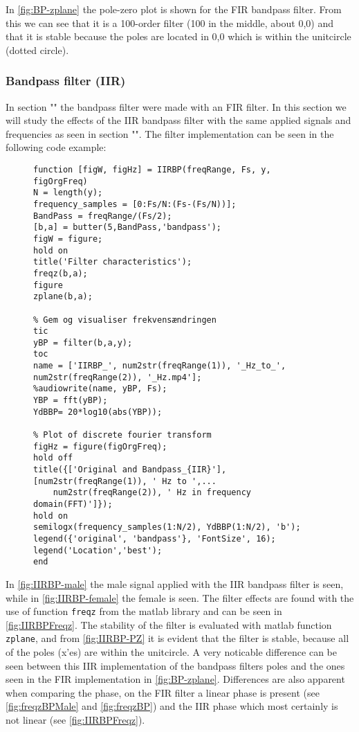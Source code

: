 In \cref{fig:BP-zplane} the pole-zero plot is shown for the FIR bandpass filter. From this we can see that it is a 100-order filter (100 in the middle, about 0,0) and that it is stable because the poles are located in 0,0 which is within the unitcircle (dotted circle).  

\subsubsection{Bandpass filter (IIR)}
In section "" the bandpass filter were made with an FIR filter. In this section we will study the effects of the IIR bandpass filter with the same applied signals and frequencies as seen in section "". The filter implementation can be seen in the following code example:

\begin{figure}[H]
\begin{verbatim}
function [figW, figHz] = IIRBP(freqRange, Fs, y, figOrgFreq)
N = length(y);
frequency_samples = [0:Fs/N:(Fs-(Fs/N))];
BandPass = freqRange/(Fs/2);
[b,a] = butter(5,BandPass,'bandpass');
figW = figure;
hold on
title('Filter characteristics');
freqz(b,a);
figure
zplane(b,a);

% Gem og visualiser frekvensændringen
tic
yBP = filter(b,a,y);
toc
name = ['IIRBP_', num2str(freqRange(1)), '_Hz_to_', num2str(freqRange(2)), '_Hz.mp4'];
%audiowrite(name, yBP, Fs);
YBP = fft(yBP);
YdBBP= 20*log10(abs(YBP));

% Plot of discrete fourier transform
figHz = figure(figOrgFreq);
hold off
title({['Original and Bandpass_{IIR}'], [num2str(freqRange(1)), ' Hz to ',...
	num2str(freqRange(2)), ' Hz in frequency domain(FFT)']});
hold on
semilogx(frequency_samples(1:N/2), YdBBP(1:N/2), 'b');
legend({'original', 'bandpass'}, 'FontSize', 16);
legend('Location','best');
end
\end{verbatim}
\end{figure}

In \cref{fig:IIRBP-male} the male signal applied with the IIR bandpass filter is seen, while in \cref{fig:IIRBP-female} the female is seen. The filter effects are found with the use of function \texttt{freqz} from the matlab library and can be seen in \cref{fig:IIRBPFreqz}. The stability of the filter is evaluated with matlab function \texttt{zplane}, and from \cref{fig:IIRBP-PZ} it is evident that the filter is stable, because all of the poles (x'es) are within the unitcircle. A very noticable difference can be seen between this IIR implementation of the bandpass filters poles and the ones seen in the FIR implementation in \cref{fig:BP-zplane}. Differences are also apparent when comparing the phase, on the FIR filter a linear phase is present (see \cref{fig:freqzBPMale} and \cref{fig:freqzBP}) and the IIR phase which most certainly is not linear (see \cref{fig:IIRBPFreqz}).

